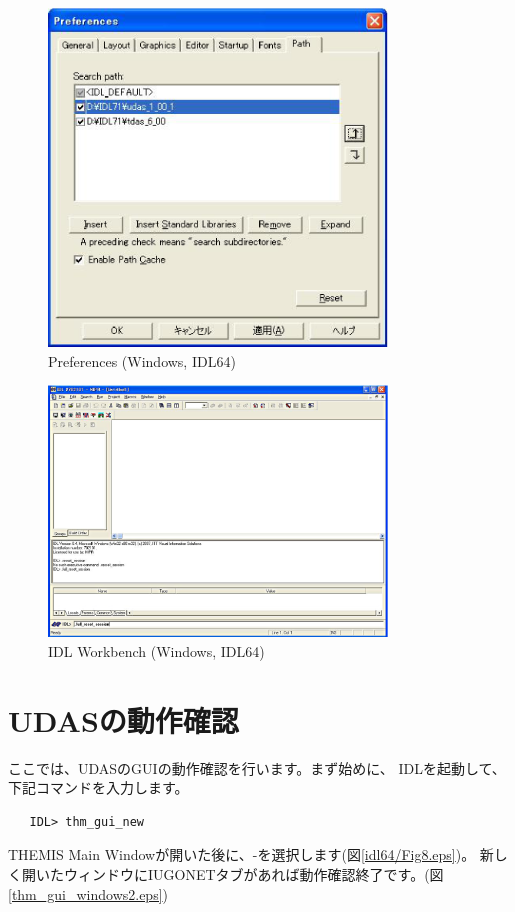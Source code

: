 \documentclass[a4j]{jbook}
\begin{document}
\begin{figure}[H]
\begin{center}
\includegraphics[width=9cm]{fig_idl64/Fig5.eps}
\caption{Preferences (Windows, IDL64)}
\label{idl64/Fig5.eps}
\end{center}
\end{figure}

\begin{figure}[H]
\begin{center}
\includegraphics[width=9cm]{fig_idl64/Fig6.eps}
\caption{IDL Workbench (Windows, IDL64)}
\label{idl64/Fig6.eps}
\end{center}
\end{figure}

\section{UDASの動作確認}
ここでは、UDASのGUIの動作確認を行います。まず始めに、
IDLを起動して、下記コマンドを入力します。
\begin{screen}
\begin{verbatim}
   IDL> thm_gui_new
\end{verbatim}
\end{screen}
THEMIS Main Windowが開いた後に、-を選択します(図\ref{idl64/Fig8.eps})。
新しく開いたウィンドウにIUGONETタブがあれば動作確認終了です。(図\ref{thm_gui_windows2.eps})
\end{document}
